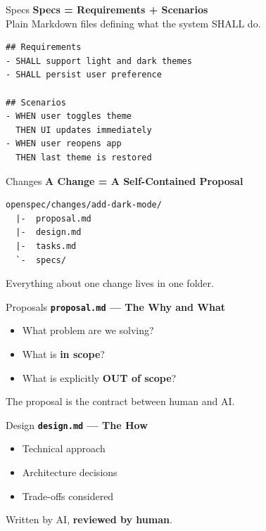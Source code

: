\documentclass[aspectratio=169,18pt]{beamer}
\begin{document}

\begin{frame}[fragile]{Specs}
  \textbf{Specs = Requirements + Scenarios}\\[0.5em]
  Plain Markdown files defining what the system SHALL do.
  \vspace{0.3em}
\begin{lstlisting}
## Requirements
- SHALL support light and dark themes
- SHALL persist user preference

## Scenarios
- WHEN user toggles theme
  THEN UI updates immediately
- WHEN user reopens app
  THEN last theme is restored
\end{lstlisting}
\end{frame}

\begin{frame}[fragile]{Changes}
  \textbf{A Change = A Self-Contained Proposal}\\[0.8em]
\begin{lstlisting}
openspec/changes/add-dark-mode/
  |-  proposal.md
  |-  design.md
  |-  tasks.md
  `-  specs/
\end{lstlisting}
  \vspace{0.8em}
  Everything about one change lives in one folder.
\end{frame}

\begin{frame}{Proposals}
  \textbf{\texttt{proposal.md} — The Why and What}\\[1em]
  \begin{itemize}\setlength\itemsep{0.5em}
    \item What problem are we solving?
    \item What is \textbf{in scope}?
    \item What is explicitly \textbf{OUT of scope}?
  \end{itemize}
  \vspace{1em}
  The proposal is the contract between human and AI.
\end{frame}

\begin{frame}{Design}
  \textbf{\texttt{design.md} — The How}\\[1em]
  \begin{itemize}\setlength\itemsep{0.5em}
    \item Technical approach
    \item Architecture decisions
    \item Trade-offs considered
  \end{itemize}
  \vspace{1em}
  Written by AI, \textbf{reviewed by human}.
\end{frame}
\end{document}
